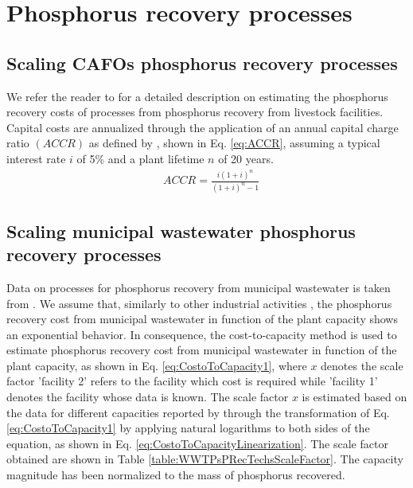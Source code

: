 \documentclass[authoryear]{elsarticle}
\begin{document}
	
\section{Phosphorus recovery processes}	
\subsection{Scaling CAFOs phosphorus recovery processes}
We refer the reader to \citet{martin2021geospatial} for a detailed description on estimating the phosphorus recovery costs of processes from phosphorus recovery from livestock facilities. Capital costs are annualized through the application of an annual capital charge ratio $\left( ACCR\right)$ as defined by \citet{towler2013chemical}, shown in Eq. \ref{eq:ACCR}, assuming a typical interest rate $i$ of 5\% and a plant lifetime $n$ of 20 years.
\begin{align}
	& ACCR = \frac{i\left( 1 + i\right)^n }{\left(1+i \right)^n -1 } \label{eq:ACCR}
\end{align}

\subsection{Scaling municipal wastewater phosphorus recovery processes}
Data on processes for phosphorus recovery from municipal wastewater is taken from \citet{egle_phosphorus_2016}. We assume that, similarly to other industrial activities \citep{dysert2005so}, the phosphorus recovery cost from municipal wastewater in function of the plant capacity shows an exponential behavior. In consequence, the cost-to-capacity method \citep{baumann2014cost} is used to estimate phosphorus recovery cost from municipal wastewater in function of the plant capacity, as shown in Eq. \ref{eq:CostoToCapacity1}, where $x$ denotes the scale factor 'facility 2' refers to the facility which cost is required while 'facility 1' denotes the facility whose data is known. The scale factor $x$ is estimated based on the data for different capacities reported by \citet{egle_phosphorus_2016} through the transformation of Eq. \ref{eq:CostoToCapacity1} by applying natural logarithms to both sides of the equation, as shown in Eq. \ref{eq:CostoToCapacityLinearization}. The scale factor obtained are shown in Table \ref{table:WWTPsPRecTechsScaleFactor}. The capacity magnitude has been normalized to the mass of phosphorus recovered.
\end{document}
